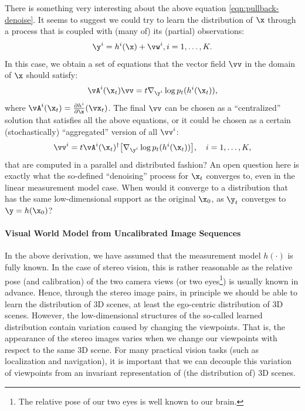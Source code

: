 \documentclass[../../book-main_zh.tex]{subfiles}
\begin{document}
\begin{remark}
    {There is something very interesting about the above equation
        \eqref{eqn:pullback-denoise}. It seems to suggest we could
        try to learn the distribution of $\x$ through a process that
        is coupled with (many of) its (partial) observations:
        \begin{equation}
            \y^i = h^i(\x) +\vw^i, i =1, \ldots, K.
        \end{equation} In this case, we obtain a set of equations
        that the vector field $\vv$ in the domain of $\x$ should satisfy:
        \begin{equation}
            \vA^i(\x_t) \vv = t \nabla_{\y^i} \log p_t(h^i(\x_t)),
            \label{eqn:federated-pushforward}
        \end{equation}
        where $\vA^i(\x_t) = \frac{\partial h^i}{\partial
        \x}(\vx_t)$. The final $\vv$ can be chosen as a
        ``centralized'' solution that satisfies all the above
        equations, or it could be chosen as a certain
        (stochastically) ``aggregated'' version of all $\vv^i$:
        \begin{equation}
            \vv^i = t\vA^i(\x_t)^\dagger \big[\nabla_{\y^i} \log
            p_t(h^i(\x_t))\big], \quad i = 1, \ldots, K,
        \end{equation}
        that are computed in a parallel and distributed fashion? An open
        question here is exactly what the so-defined ``denoising''
        process for $\x_t$ converges to, even in the linear measurement
        model case. When would it converge to a distribution that has the
        same low-dimensional support as the original $\x_0$, as $\y_t$
    converges to $\y = h(\x_0)$? }
\end{remark}

\paragraph{Visual World Model from Uncalibrated Image Sequences}

In the above derivation, we have assumed that the measurement model
$h(\cdot)$ is fully known. In the case of stereo vision, this is
rather reasonable as the relative pose (and calibration) of the two
camera views (or two eyes\footnote{The relative pose of our two eyes
is well known to our brain.}) is usually known in advance. Hence,
through the stereo image pairs, in principle we should be able to
learn the distribution of 3D scenes, at least the ego-centric
distribution of 3D scenes. However, the low-dimensional structures of
the so-called learned distribution contain variation caused by
changing the viewpoints. That is, the appearance of the stereo images
varies when we change our viewpoints with respect to the same 3D
scene. For many practical vision tasks (such as localization and
navigation), it is important that we can decouple this variation of
viewpoints from an invariant representation of (the distribution of) 3D scenes.
\end{document}
